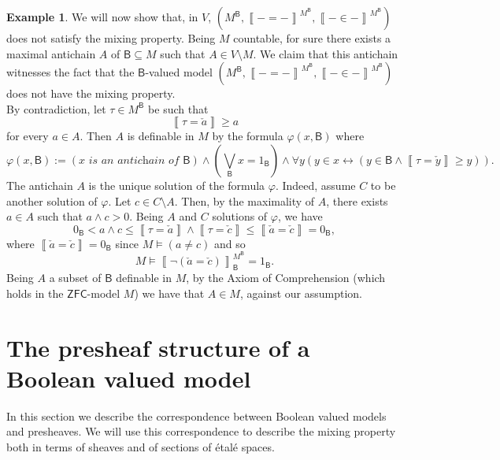 \documentclass[11pt]{amsart}
\newcommand{\nphi}{\varphi}
\theoremstyle{plain}
\theoremstyle{definition}
\newtheorem{example}[theorem]{Example}
\theoremstyle{plain}
\theoremstyle{remark}
\newcommand{\ZFC}{\ensuremath{\mathsf{ZFC}}}
\newcommand{\bool}[1]{\mathsf{#1}}
\newcommand{\Qp}[1]{\left\llbracket #1 \right\rrbracket}
\newcommand{\lrao} {\leftrightarrow}
\newcommand{\0}{\mathsf{0}}
\renewcommand{\1}{\mathsf{1}}
\renewcommand{\2}{\mathsf{2}}
\theoremstyle{definition}
\begin{document}
\begin{example}
We will now show that, in $V$, $(M^{\bool{B}},\Qp{-=-}^{M^{\bool{B}}},\Qp{-\in-}^{M^{\bool{B}}})$ does not satisfy the 
mixing property. Being $M$ countable, for sure there exists a maximal antichain $A$ of $\bool{B}\subseteq M$ such that 
$A\in V\setminus M$. We claim that this antichain witnesses the fact that the $\bool{B}$-valued model 
$(M^{\bool{B}},\Qp{-=-}^{M^{\bool{B}}},\Qp{-\in-}^{M^{\bool{B}}})$ 
does not have the mixing property.\\
By contradiction, let $\tau\in M^{\bool{B}}$ be such that
\[
\Qp{\tau=\check{a}}\geq a
\]
for every $a\in A$. Then $A$ is definable in $M$ by the formula $\nphi(x,\bool{B})$ where
\[
\nphi(x,\bool{B}):=(x\textit{ is an antichain of $\bool{B}$})\wedge(\bigvee_{\bool{B}}x=1_{\bool{B}})\wedge\forall y(y\in x\lrao(y\in\bool{B}\wedge\Qp{\tau=\check{y}}\geq y)).
\]
The antichain $A$ is the unique solution of the formula $\nphi$. Indeed, assume $C$ to be another solution of $\nphi$. 
Let $c\in C\setminus A$. Then, by the maximality of $A$, there exists $a\in A$ such that $a\wedge c>0$. 
Being $A$ and $C$ solutions of $\nphi$, we have
\[
0_\bool{B}<a\wedge c\leq\Qp{\tau=\check{a}}\wedge\Qp{\tau=\check{c}}\leq\Qp{\check{a}=\check{c}}=0_{\bool{B}},
\]
where $\Qp{\check{a}=\check{c}}=0_\bool{B}$ since $M\models(a\neq c)$ and so 
\[
M\models\Qp{\neg(\check{a}=\check{c})}^{M^{\bool{B}}}_{\bool{B}}=1_\bool{B}.
\]
Being $A$ a subset of $\bool{B}$ definable in $M$, by the Axiom of Comprehension (which holds in the $\ZFC$-model $M$) we have that $A\in M$, against our assumption.
\end{example}











\section{The presheaf structure of a Boolean valued model}
\label{sec:pres}
In this section we describe the correspondence between Boolean valued models and presheaves. We will use this correspondence to describe the mixing property both in terms of sheaves and of sections of \'etal\'e spaces.
\end{document}
